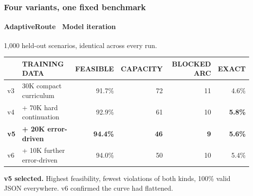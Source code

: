 \documentclass[aspectratio=169,10pt]{beamer}
\newcommand{\cy}[1]{{\color{arCyan2}\bfseries #1}}
\newcommand{\muted}[1]{{\color{arMuted} #1}}
\begin{document}
\begin{frame}
  \frametitle{Four variants, one fixed benchmark}
  \framesubtitle{AdaptiveRoute \textperiodcentered\ Model iteration}

  \vspace{0.1em}
  \muted{1{,}000 held-out scenarios, identical across every run.}

  \vspace{1.0em}
  \centering
  \small
  \begin{tabular}{@{}llrrrr@{}}
    \toprule
    \rowcolor{arBg}
    \color{arCyan}\scriptsize\bfseries &
    \color{arCyan}\scriptsize\bfseries TRAINING DATA &
    \color{arCyan}\scriptsize\bfseries FEASIBLE &
    \color{arCyan}\scriptsize\bfseries CAPACITY &
    \color{arCyan}\scriptsize\bfseries BLOCKED ARC &
    \color{arCyan}\scriptsize\bfseries EXACT \\
    \midrule
    \color{arText}v3 & \muted{30K compact curriculum}     & \muted{91.7\%} & \muted{72} & \muted{11} & \muted{4.6\%} \\
    \color{arText}v4 & \muted{+ 70K hard continuation}    & \muted{92.9\%} & \muted{61} & \muted{10} & \muted{\textbf{5.8\%}} \\
    \rowcolor{arPanel2}
    \color{arCyan2}\bfseries v5 & \color{arText}\bfseries + 20K error-driven &
      \color{arText}\bfseries 94.4\% & \color{arText}\bfseries 46 &
      \color{arText}\bfseries 9 & \color{arText}\bfseries 5.6\% \\
    \color{arText}v6 & \muted{+ 10K further error-driven} & \muted{94.0\%} & \muted{50} & \muted{10} & \muted{5.4\%} \\
    \bottomrule
  \end{tabular}

  \vspace{1.2em}
  \begin{minipage}{0.90\linewidth}
    \raggedright
    \cy{v5 selected.} Highest feasibility, fewest violations of both kinds, 100\% valid JSON
    everywhere. \muted{v6 confirmed the curve had flattened.}
  \end{minipage}

\end{frame}
\end{document}
